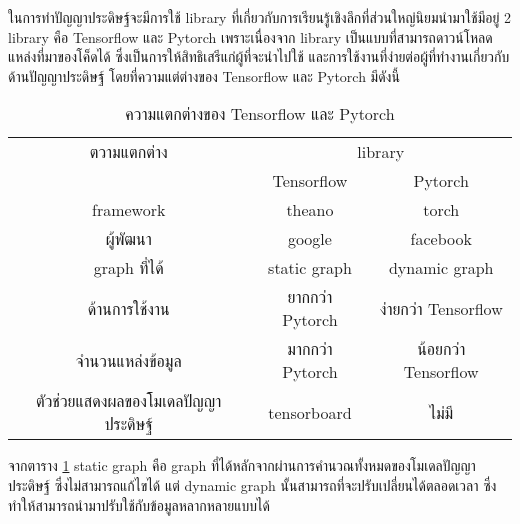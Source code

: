ในการทำปัญญาประดิษฐ์จะมีการใช้ library ที่เกี่ยวกับการเรียนรู้เชิงลึกที่ส่วนใหญ่นิยมนำมาใช้มีอยู่ 2 library คือ Tensorflow และ Pytorch เพราะเนื่องจาก library 
เป็นแบบที่สามารถดาวน์โหลดแหล่งที่มาของโค็ดได้ ซึ่งเป็นการให้สิทธิเสรีแก่ผู้ที่จะนำไปใช้ และการใช้งานที่ง่ายต่อผู้ที่ทำงานเกี่ยวกับด้านปัญญาประดิษฐ์ โดยที่ความแต่ต่างของ Tensorflow 
และ Pytorch มีดังนี้

\begin{table}[!ht]
	\centering
	\begin{tabular}{|c|c|c|}
		\hline
		{ตวามแตกต่าง}&\multicolumn{2}{c|}{library}\\
		\cline{2-3}
		{}								& Tensorflow					& Pytorch				\\
		\hline
		framework							& theano						& torch				\\
		\hline
		ผู้พัฒนา							& google						& facebook			\\
		\hline
		graph ที่ได้							& static graph					& dynamic graph		\\
		\hline
		ด้านการใช้งาน						& ยากกว่า Pytorch				& ง่ายกว่า Tensorflow		\\
		\hline
		จำนวนแหล่งข้อมูล					& มากกว่า Pytorch				& น้อยกว่า Tensorflow		\\
		\hline
		ตัวช่วยแสดงผลของโมเดลปัญญาประดิษฐ์		& tensorboard					& ไม่มี				\\
		\hline
	\end{tabular}
	\caption{ความแตกต่างของ Tensorflow และ Pytorch}
	\label{tab: ความแตกต่างของ Tensorflow และ Pytorch}
\end{table}

จากตาราง \ref{tab: ความแตกต่างของ Tensorflow และ Pytorch} static graph คือ graph ที่ได้หลักจากผ่านการคำนวณทั้งหมดของโมเดลปัญญาประดิษฐ์ 
ซึ่งไม่สามารถแก้ไขได้ แต่ dynamic graph นั้นสามารถที่จะปรับเปลี่ยนได้ตลอดเวลา ซึ่งทำให้สามารถนำมาปรับใช้กับข้อมูลหลากหลายแบบได้

